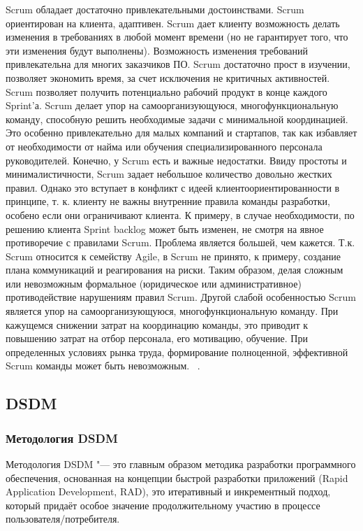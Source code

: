 \documentclass{../industrial-development}
\begin{document}
\lecturenotes
Scrum обладает достаточно привлекательными достоинствами. Scrum ориентирован на клиента, адаптивен. Scrum дает клиенту возможность делать изменения в требованиях в любой момент времени (но не гарантирует того, что эти изменения будут выполнены). Возможность изменения требований привлекательна для многих заказчиков ПО. Scrum достаточно прост в изучении, позволяет экономить время, за счет исключения не критичных активностей. Scrum позволяет получить потенциально рабочий продукт в конце каждого Sprint'а. Scrum делает упор на самоорганизующуюся, многофункциональную команду, способную решить необходимые задачи с минимальной координацией. Это особенно привлекательно для малых компаний и стартапов, так как избавляет от необходимости от найма или обучения специализированного персонала руководителей. Конечно, у Scrum есть и важные недостатки. Ввиду простоты и минималистичности, Scrum задает небольшое количество довольно жестких правил. Однако это вступает в конфликт с идеей клиентоориентированности в принципе, т. к. клиенту не важны внутренние правила команды разработки, особено если они ограничивают клиента. К примеру, в случае необходимости, по решению клиента Sprint backlog может быть изменен, не смотря на явное противоречие с правилами Scrum. 
Проблема является большей, чем кажется. Т.к. Scrum относится к семейству Agile, в Scrum не принято, к примеру, создание плана коммуникаций и реагирования на риски. Таким образом, делая сложным или невозможным формальное (юридическое или административное) противодействие нарушениям правил Scrum. Другой слабой особенностью Scrum является упор на самоорганизующуюся, многофункциональную команду. При кажущемся снижении затрат на координацию команды, это приводит к повышению затрат на отбор персонала, его мотивацию, обучение. При определенных условиях рынка труда, формирование полноценной, эффективной Scrum команды может быть невозможным. 
~\cite{Fowler}.


\subsection{DSDM}
\begin{frame} \frametitle{Методология DSDM}
  \begin{block}{}
   \alert{Методология DSDM} "--- это главным образом методика разработки программного обеспечения, основанная на концепции быстрой разработки приложений (Rapid Application Development, RAD), это итеративный и инкрементный подход, который придаёт особое значение продолжительному участию в процессе пользователя/потребителя.
  \end{block}
\end{frame}
\end{document}
